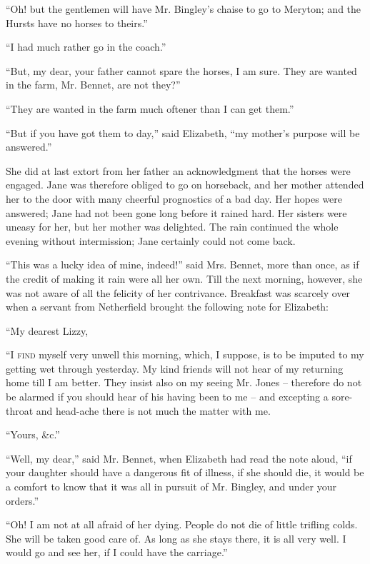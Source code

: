 “Oh! but the gentlemen will have Mr. Bingley’s chaise
to go to Meryton; and the Hursts have no horses to
theirs.”

“I had much rather go in the coach.”

“But, my dear, your father cannot spare the horses,
I am sure. They are wanted in the farm, Mr. Bennet,
are not they?”

“They are wanted in the farm much oftener than I can
get them.”

“But if you have got them to day,” said Elizabeth,
“my mother’s purpose will be answered.”

She did at last extort from her father an acknowledgment
that the horses were engaged. Jane was therefore
obliged to go on horseback, and her mother attended her
to the door with many cheerful prognostics of a bad day.
Her hopes were answered; Jane had not been gone long
before it rained hard. Her sisters were uneasy for her, but
her mother was delighted. The rain continued the whole
evening without intermission; Jane certainly could not
come back.

“This was a lucky idea of mine, indeed!” said Mrs.
Bennet, more than once, as if the credit of making it rain
were all her own. Till the next morning, however, she
was not aware of all the felicity of her contrivance. Breakfast
was scarcely over when a servant from Netherfield
brought the following note for Elizabeth:

\begin{letter}
“My dearest Lizzy,

“I \textsc{find} myself very unwell this morning, which,
I suppose, is to be imputed to my getting wet through
yesterday. My kind friends will not hear of my returning
home till I am better. They insist also on my seeing
Mr. Jones -- therefore do not be alarmed if you should
hear of his having been to me -- and excepting a sore-%
throat and head-ache there is not much the matter with
me.

\raggedleft “Yours, \&c.”
\end{letter}

“Well, my dear,” said Mr. Bennet, when Elizabeth had
read the note aloud, “if your daughter should have a
dangerous fit of illness, if she should die, it would be
a comfort to know that it was all in pursuit of Mr. Bingley,
and under your orders.”

“Oh! I am not at all afraid of her dying. People
do not die of little trifling colds. She will be taken good
care of. As long as she stays there, it is all very well.
I would go and see her, if I could have the carriage.”


